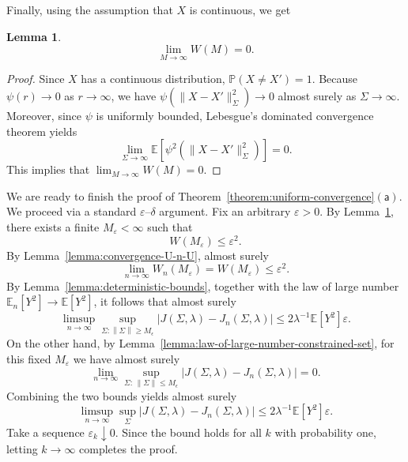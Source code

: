 \documentclass[sn-mathphys-num]{sn-jnl}%
\numberwithin{equation}{section}
\newcommand{\E}{\mathbb{E}}
\newcommand{\norm}[1]{\left\|{#1}\right\|} %
\renewcommand{\P}{\mathbb{P}}
\newtheorem{lemma}{Lemma}
\newcommand{\eps}{\epsilon}
\theoremstyle{thmstyleone}%
\theoremstyle{thmstyletwo}%
\theoremstyle{thmstylethree}%
\begin{document}
\vspace{.5em} 

Finally, using the assumption that $X$ is continuous, we get

\vspace{.5em} 
\begin{lemma}
\label{lemma:limit-U}
\begin{equation*}
	\lim_{M \to \infty} W(M) = 0.
\end{equation*}  
\end{lemma} 
\begin{proof} 
Since $X$ has a continuous distribution, $\P(X \neq X') = 1$. Because $\psi(r) \to 0$ as $r \to \infty$, we have
$\psi(\|X - X'\|_\Sigma^2) \to 0$ almost surely as $\Sigma \to\infty$. 
Moreover, since $\psi$ is uniformly bounded, Lebesgue’s dominated convergence theorem yields
\begin{equation*}
	\lim_{\Sigma \to \infty} \E\!\left[\psi^2\!\left(\|X - X'\|_{\Sigma}^2\right) \right] = 0.
\end{equation*}  
This implies that $\lim_{M \to \infty} W(M) = 0$. 
\end{proof} 


We are ready to finish the proof of Theorem~\ref{theorem:uniform-convergence}$\mathsf{(a)}$. 
We proceed via a standard $\varepsilon$--$\delta$ argument.
Fix an arbitrary $\varepsilon > 0$. By Lemma~\ref{lemma:limit-U}, there exists a finite $M_\varepsilon < \infty$ such that
\[
	W(M_\varepsilon) \le \varepsilon^2.
\]
By Lemma~\ref{lemma:convergence-U-n-U}, almost surely 
\[
	\lim_{n \to \infty} W_n(M_\varepsilon) =  W(M_\varepsilon) \le \varepsilon^2.
\]
By Lemma~\ref{lemma:deterministic-bounds}, together with the law of large number
$\E_n[Y^2] \to \E[Y^2]$, it follows that almost surely
\[
	\limsup_{n\to \infty} \sup_{\Sigma: \norm{\Sigma} \ge M_\eps} \bigl|J(\Sigma, \lambda) - J_n(\Sigma, \lambda)\bigr| 
		\le 2 \lambda^{-1} \E[Y^2] \varepsilon.
\]
On the other hand, by Lemma~\ref{lemma:law-of-large-number-constrained-set}, for this fixed $M_\varepsilon$ we have almost surely
\begin{equation*}
	\lim_{n\to \infty} \sup_{\Sigma:\,\|\Sigma\| \le M_\eps} 
	\bigl|J(\Sigma, \lambda) - J_n(\Sigma, \lambda)\bigr|
	= 0.
\end{equation*}
Combining the two bounds yields almost surely
\begin{equation*}
	\limsup_{n\to \infty} \sup_{\Sigma} \bigl|J(\Sigma, \lambda) - J_n(\Sigma, \lambda)\bigr| \le 2 \lambda^{-1} \E[Y^2] \varepsilon.
\end{equation*}
Take a sequence $\varepsilon_k \downarrow 0$. Since the bound holds for all $k$
with probability one, letting $k \to \infty$ completes the proof.
\end{document}
